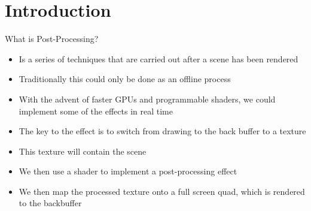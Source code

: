 \part{Introduction}
\frame{\partpage}

\begin{frame}{What is Post-Processing?}
	\begin{itemize}
		\pause\item Is a series of techniques that are carried out after a scene has been rendered
		\pause\item Traditionally this could only be done as an offline process
		\pause\item With the advent of faster GPUs and programmable shaders, we could implement some of the effects in real time
		\pause\item The key to the effect is to switch from drawing to the back buffer to a texture
		\pause\item This texture will contain the scene
		\pause\item We then use a shader to implement a post-processing effect
		\pause\item We then map the processed texture onto a full screen quad, which is rendered to the backbuffer
	\end{itemize}
\end{frame}